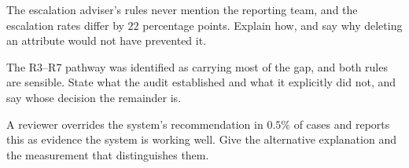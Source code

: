 \begin{checkpoint}
\begin{tightnum}
  \item The escalation adviser's rules never mention the reporting team, and the
        escalation rates differ by $22$ percentage points. Explain how, and say why
        deleting an attribute would not have prevented it.
  \item The R3--R7 pathway was identified as carrying most of the gap, and both rules are sensible.
        State what the audit established and what it explicitly did not, and say
        whose decision the remainder is.
  \item A reviewer overrides the system's recommendation in $0.5\%$ of cases and
        reports this as evidence the system is working well. Give the alternative
        explanation and the measurement that distinguishes them.
\end{tightnum}
\end{checkpoint}

